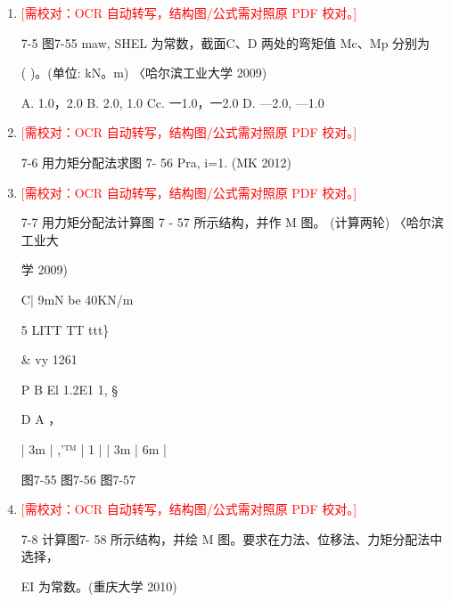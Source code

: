 \documentclass[UTF8,12pt,a4paper,openany]{ctexbook}
\newcommand{\TODO}[1]{\textcolor{red}{[需校对：#1]}}
\begin{document}
\begin{enumerate}[label=\textbf{\arabic*.},leftmargin=2em]
\item \TODO{OCR 自动转写，结构图/公式需对照原 PDF 校对。}\par 7-5 图7-55 maw, SHEL 为常数，截面C、D 两处的弯矩值 Mc、Mp 分别为\par (    )。(单位: kN。m) 〈哈尔滨工业大学 2009)\par A. 1.0，2.0       B. 2.0, 1.0       Cc. 一1.0，一2.0 D. —2.0, —1.0
\item \TODO{OCR 自动转写，结构图/公式需对照原 PDF 校对。}\par 7-6 用力矩分配法求图 7- 56 Pra, i=1. (MK 2012)
\item \TODO{OCR 自动转写，结构图/公式需对照原 PDF 校对。}\par 7-7 用力矩分配法计算图 7 - 57 所示结构，并作 M 图。 (计算两轮) 〈哈尔滨工业大\par 学 2009)\par C| 9mN             be                                      40KN/m\par 5                                        LITT TT ttt\}\par \&             vy                              1261\par P           B                              El        1.2E1        1,      §\par D                    A                                                    ，\par |  3m    |  ,'™                |     1     |                |   3m    |       6m        |\par 图7-55             图7-56                  图7-57
\item \TODO{OCR 自动转写，结构图/公式需对照原 PDF 校对。}\par 7-8 计算图7- 58 所示结构，并绘 M 图。要求在力法、位移法、力矩分配法中选择，\par EI 为常数。(重庆大学 2010)

\end{enumerate}
\end{document}
